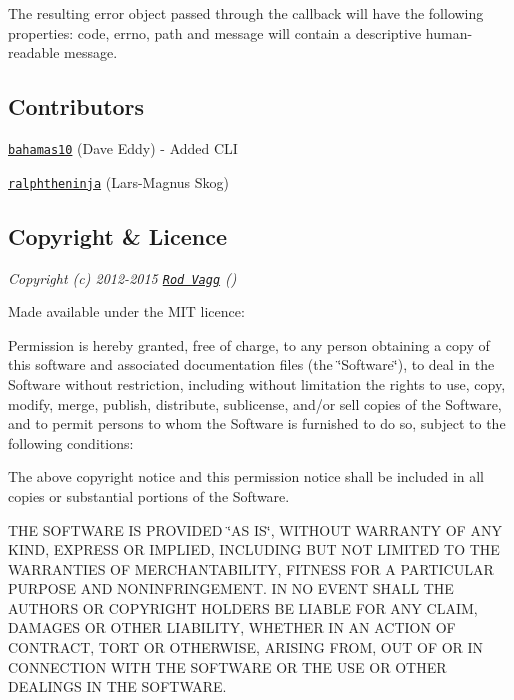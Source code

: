 The resulting error object passed through the callback will have the following properties\+: {\ttfamily code}, {\ttfamily errno}, {\ttfamily path} and {\ttfamily message} will contain a descriptive human-\/readable message.

\subsection*{Contributors}


\begin{DoxyItemize}
\item \href{https://github.com/bahamas10}{\tt bahamas10} (Dave Eddy) -\/ Added C\+LI
\item \href{https://github.com/ralphtheninja}{\tt ralphtheninja} (Lars-\/\+Magnus Skog)
\end{DoxyItemize}

\subsection*{Copyright \& Licence}

{\itshape Copyright (c) 2012-\/2015 \href{https://github.com/rvagg}{\tt Rod Vagg} (\href{https://twitter.com/rvagg}{\tt })}

Made available under the M\+IT licence\+:

Permission is hereby granted, free of charge, to any person obtaining a copy of this software and associated documentation files (the \char`\"{}\+Software\char`\"{}), to deal in the Software without restriction, including without limitation the rights to use, copy, modify, merge, publish, distribute, sublicense, and/or sell copies of the Software, and to permit persons to whom the Software is furnished to do so, subject to the following conditions\+:

The above copyright notice and this permission notice shall be included in all copies or substantial portions of the Software.

T\+HE S\+O\+F\+T\+W\+A\+RE IS P\+R\+O\+V\+I\+D\+ED \char`\"{}\+A\+S I\+S\char`\"{}, W\+I\+T\+H\+O\+UT W\+A\+R\+R\+A\+N\+TY OF A\+NY K\+I\+ND, E\+X\+P\+R\+E\+SS OR I\+M\+P\+L\+I\+ED, I\+N\+C\+L\+U\+D\+I\+NG B\+UT N\+OT L\+I\+M\+I\+T\+ED TO T\+HE W\+A\+R\+R\+A\+N\+T\+I\+ES OF M\+E\+R\+C\+H\+A\+N\+T\+A\+B\+I\+L\+I\+TY, F\+I\+T\+N\+E\+SS F\+OR A P\+A\+R\+T\+I\+C\+U\+L\+AR P\+U\+R\+P\+O\+SE A\+ND N\+O\+N\+I\+N\+F\+R\+I\+N\+G\+E\+M\+E\+NT. IN NO E\+V\+E\+NT S\+H\+A\+LL T\+HE A\+U\+T\+H\+O\+RS OR C\+O\+P\+Y\+R\+I\+G\+HT H\+O\+L\+D\+E\+RS BE L\+I\+A\+B\+LE F\+OR A\+NY C\+L\+A\+IM, D\+A\+M\+A\+G\+ES OR O\+T\+H\+ER L\+I\+A\+B\+I\+L\+I\+TY, W\+H\+E\+T\+H\+ER IN AN A\+C\+T\+I\+ON OF C\+O\+N\+T\+R\+A\+CT, T\+O\+RT OR O\+T\+H\+E\+R\+W\+I\+SE, A\+R\+I\+S\+I\+NG F\+R\+OM, O\+UT OF OR IN C\+O\+N\+N\+E\+C\+T\+I\+ON W\+I\+TH T\+HE S\+O\+F\+T\+W\+A\+RE OR T\+HE U\+SE OR O\+T\+H\+ER D\+E\+A\+L\+I\+N\+GS IN T\+HE S\+O\+F\+T\+W\+A\+RE. 